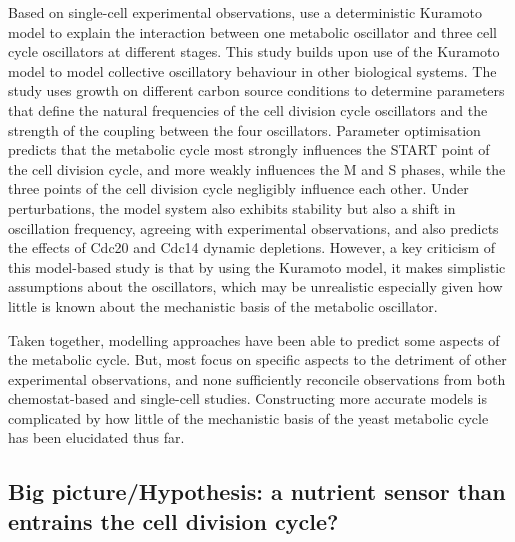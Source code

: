 Based on single-cell experimental observations, \citet{ozsezenInferenceHighLevelInteraction2019} use a deterministic Kuramoto model to explain the interaction between one metabolic oscillator and three cell cycle oscillators at different stages.
This study builds upon use of the Kuramoto model to model collective oscillatory behaviour in other biological systems.
The study uses growth on different carbon source conditions to determine parameters that define the natural frequencies of the cell division cycle oscillators and the strength of the coupling between the four oscillators.
Parameter optimisation predicts that the metabolic cycle most strongly influences the START point of the cell division cycle, and more weakly influences the M and S phases, while the three points of the cell division cycle negligibly influence each other.
Under perturbations, the model system also exhibits stability but also a shift in oscillation frequency, agreeing with experimental observations, and also predicts the effects of Cdc20 and Cdc14 dynamic depletions.
However, a key criticism of this model-based study is that by using the Kuramoto model, it makes simplistic assumptions about the oscillators, which may be unrealistic especially given how little is known about the mechanistic basis of the metabolic oscillator.


Taken together, modelling approaches have been able to predict some aspects of the metabolic cycle.
But, most focus on specific aspects to the detriment of other experimental observations, and none sufficiently reconcile observations from both chemostat-based and single-cell studies.
Constructing more accurate models is complicated by how little of the mechanistic basis of the yeast metabolic cycle has been elucidated thus far.

\subsection{Big picture/Hypothesis: a nutrient sensor than entrains the cell division cycle?}
\label{subsec:intro-ymc-hypothesis}

